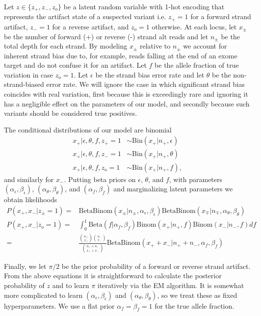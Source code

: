 \documentclass[nofootinbib,amssymb,amsmath]{revtex4}
\begin{document}
Let $z \in \{ z_+, z_-, z_o \}$ be a latent random variable with 1-hot encoding that represents the artifact state of a suspected variant i.e. $z_+ = 1$ for a forward strand artifact, $z_- = 1$ for a reverse artifact, and $z_o = 1$ otherwise. At each locus, let $x_\pm$ be the number of forward (+) or reverse (-) strand alt reads and let $n_\pm$ be the total depth for each strand.  By modeling $x_\pm$ relative to $n_\pm$ we account for inherent strand bias due to, for example, reads falling at the end of an exome target and do not confuse it for an artifact.  Let $f$ be the allele fraction of true variation in case $z_o = 1$.  Let $\epsilon$ be the strand bias error rate and let $\theta$ be the non-strand-biased error rate.  We will ignore the case in which significant strand bias coincides with real variation, first because this is exceedingly rare and ignoring it has a negligible effect on the parameters of our model, and secondly because such variants should be considered true positives.


The conditional distributions of our model are binomial
\begin{align}
x_+ | \epsilon, \theta, f, z_+ = 1 &\sim \text{Bin} (x_+ | n_+, \epsilon) \\
x_+ | \epsilon, \theta, f, z_- = 1 &\sim \text{Bin} (x_+ | n_+, \theta) \\
x_+ | \epsilon, \theta, f, z_o = 1 &\sim \text{Bin} (x_+ | n_+, f),
\end{align}
and similarly for $x_-$.  Putting beta priors on $\epsilon$, $\theta$, and $f$, with parameters $(\alpha_\epsilon, \beta_\epsilon)$, $(\alpha_\theta, \beta_\theta)$, and $(\alpha_f, \beta_f)$ and marginalizing latent parameters we obtain likelihoods
\begin{align}
P(x_+, x_- | z_\pm = 1) =& \text{BetaBinom}(x_\pm | n_\pm, \alpha_\epsilon, \beta_\epsilon) \text{BetaBinom}(x_\mp | n_\mp, \alpha_\theta, \beta_\theta) \\
P(x_+, x_- | z_o = 1) =& \int_0^1 \text{Beta}(f | \alpha_f, \beta_f) \text{Binom}(x_+ | n_+, f) \text{Binom}(x_- | n_-, f) df \\ 
                                  =& \frac{ \binom{n_+}{x_+} \binom{n_-}{x_-}}{\binom{n_+ + n_-}{x_+ + x_-}} \text{BetaBinom}(x_+ + x_- | n_+ + n_-, \alpha_f, \beta_f)
\end{align}

Finally, we let $\pi/2$ be the prior probability of a forward or reverse strand artifact.  From the above equations it is straightforward to calculate the posterior probability of $z$ and to learn $\pi$ iteratively via the EM algorithm.  It is somewhat more complicated to learn $(\alpha_\epsilon, \beta_\epsilon)$ and $(\alpha_\theta, \beta_\theta)$, so we treat these as fixed hyperparameters.  We use a flat prior $\alpha_f = \beta_f = 1$ for the true allele fraction.
\end{document}

